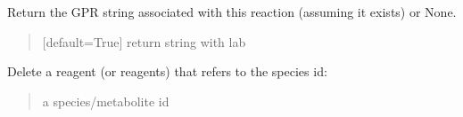 \documentclass[letterpaper,12pt,english]{sphinxmanual}
\begin{document}
\begin{fulllineitems}
\begin{fulllineitems}
\begin{quote}
\begin{description}
\end{description}\end{quote}

\end{fulllineitems}


\begin{fulllineitems}
\label{\detokenize{api/core:cbmpy.CBModel.Reaction.getGPRassociationString}}
\pysigstartsignatures
\pysiglinewithargsret
{}
{}
{}
\pysigstopsignatures
\sphinxAtStartPar
Return the GPR string associated with this reaction (assuming it exists) or None.
\begin{quote}\begin{description}
\sphinxAtStartPar
{} \textendash{} {[}default=True{]} return string with lab

\end{description}\end{quote}

\end{fulllineitems}


\begin{fulllineitems}
\label{\detokenize{api/core:cbmpy.CBModel.Reaction.deleteReagentWithSpeciesRef}}
\pysigstartsignatures
\pysiglinewithargsret
{}
{}
{}
\pysigstopsignatures
\sphinxAtStartPar
Delete a reagent (or reagents) that refers to the species id:
\begin{quote}\begin{description}
\sphinxAtStartPar
{} \textendash{} a species/metabolite id

\end{description}\end{quote}

\end{fulllineitems}



\end{fulllineitems}
\end{document}

